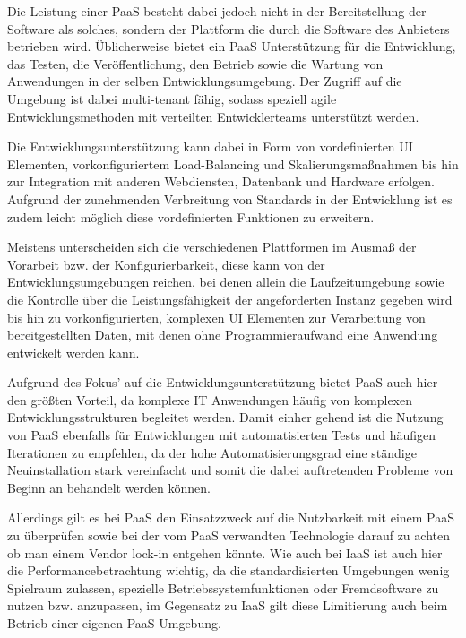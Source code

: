\documentclass[journal]{IEEEtran}
\begin{document}
Die Leistung einer PaaS besteht dabei jedoch nicht in der Bereitstellung der Software als solches, sondern der Plattform die durch die Software des Anbieters betrieben wird. Üblicherweise bietet ein PaaS Unterstützung für die Entwicklung, das Testen, die Veröffentlichung, den Betrieb sowie die Wartung von Anwendungen in der selben Entwicklungsumgebung. Der Zugriff auf die Umgebung ist dabei multi-tenant fähig, sodass speziell agile Entwicklungsmethoden mit verteilten Entwicklerteams unterstützt werden. 

Die Entwicklungsunterstützung kann dabei in Form von vordefinierten UI Elementen, vorkonfiguriertem Load-Balancing und Skalierungsmaßnahmen bis hin zur Integration mit anderen Webdiensten, Datenbank und Hardware erfolgen. Aufgrund der zunehmenden Verbreitung von Standards in der Entwicklung ist es zudem leicht möglich diese vordefinierten Funktionen zu erweitern. 

Meistens unterscheiden sich die verschiedenen Plattformen im Ausmaß der Vorarbeit bzw. der Konfigurierbarkeit, diese kann von der Entwicklungsumgebungen reichen, bei denen allein die Laufzeitumgebung sowie die Kontrolle über die Leistungsfähigkeit der angeforderten Instanz gegeben wird bis hin zu vorkonfigurierten, komplexen UI Elementen zur Verarbeitung von bereitgestellten Daten, mit denen ohne Programmieraufwand eine Anwendung entwickelt werden kann.

Aufgrund des Fokus' auf die Entwicklungsunterstützung bietet PaaS auch hier den größten Vorteil, da komplexe IT Anwendungen häufig von komplexen Entwicklungsstrukturen begleitet werden. Damit einher gehend ist die Nutzung von PaaS ebenfalls für Entwicklungen mit automatisierten Tests und häufigen Iterationen zu empfehlen, da der hohe Automatisierungsgrad eine ständige Neuinstallation stark vereinfacht und somit die dabei auftretenden Probleme von Beginn an behandelt werden können.

Allerdings gilt es bei PaaS den Einsatzzweck auf die Nutzbarkeit mit einem PaaS zu überprüfen sowie bei der vom PaaS verwandten Technologie darauf zu achten ob man einem Vendor lock-in entgehen könnte. Wie auch bei IaaS ist auch hier die Performancebetrachtung wichtig, da die standardisierten Umgebungen wenig Spielraum zulassen, spezielle Betriebssystemfunktionen oder Fremdsoftware zu nutzen bzw. anzupassen, im Gegensatz zu IaaS gilt diese Limitierung auch beim Betrieb einer eigenen PaaS Umgebung.
\end{document}

